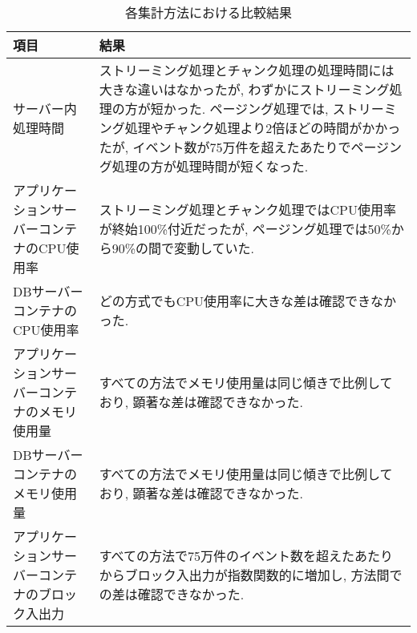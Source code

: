 \documentclass[../../../main]{subfiles}
\begin{document}
    \begin{table}[H]
        \centering
        \caption{各集計方法における比較結果}
        \label{tab:result-comparison}
        \begin{tabular}{|p{4cm}|p{10cm}|}
            \hline
            \textbf{項目}              & \textbf{結果}                                                                                                                                                                                                          \\ \hline
            サーバー内処理時間                & ストリーミング処理とチャンク処理の処理時間には大きな違いはなかったが, わずかにストリーミング処理の方が短かった. ページング処理では, ストリーミング処理やチャンク処理より2倍ほどの時間がかかったが, イベント数が75万件を超えたあたりでページング処理の方が処理時間が短くなった.  \\ \hline
            アプリケーションサーバーコンテナのCPU使用率  & ストリーミング処理とチャンク処理ではCPU使用率が終始100\%付近だったが, ページング処理では50\%から90\%の間で変動していた.                                                                                                                                                    \\ \hline
            DBサーバーコンテナのCPU使用率        & どの方式でもCPU使用率に大きな差は確認できなかった.                                                                                                                                                                                                    \\ \hline
            アプリケーションサーバーコンテナのメモリ使用量  & すべての方法でメモリ使用量は同じ傾きで比例しており, 顕著な差は確認できなかった.                                                                                                                                                                                    \\ \hline
            DBサーバーコンテナのメモリ使用量        & すべての方法でメモリ使用量は同じ傾きで比例しており, 顕著な差は確認できなかった.                                                                                                                                                                                    \\ \hline
            アプリケーションサーバーコンテナのブロック入出力 & すべての方法で75万件のイベント数を超えたあたりからブロック入出力が指数関数的に増加し, 方法間での差は確認できなかった.                                                                                                                                                                        \\ \hline

\end{tabular}
\end{table}
\end{document}
